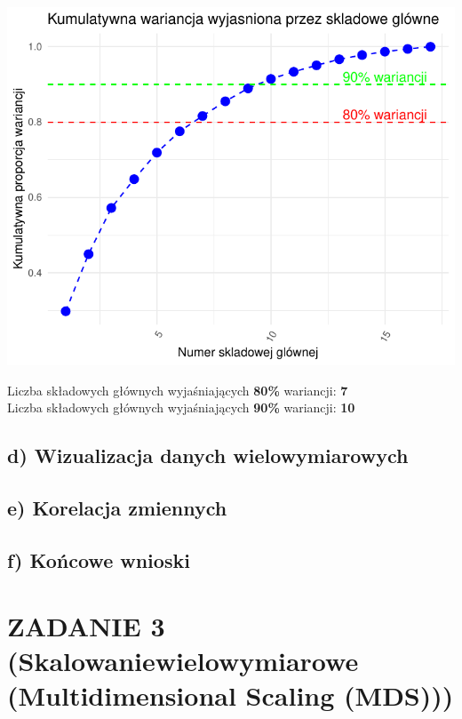 \documentclass[
  12pt,
]{article}
\begin{document}
\begin{center}\includegraphics{Sprawozdanie2_files/figure-latex/Zmiennosc_skladowych_w_PCA-2} \end{center}

Liczba składowych głównych wyjaśniających \textbf{80\%} wariancji:
\textbf{7}\\
Liczba składowych głównych wyjaśniających \textbf{90\%} wariancji:
\textbf{10}

\subsection{d) Wizualizacja danych
wielowymiarowych}\label{d-wizualizacja-danych-wielowymiarowych}

\subsection{e) Korelacja zmiennych}\label{e-korelacja-zmiennych}

\subsection{f) Końcowe wnioski}\label{f-koux144cowe-wnioski}

\section{ZADANIE 3 (Skalowaniewielowymiarowe (Multidimensional Scaling
(MDS)))}\label{zadanie-3-skalowaniewielowymiarowe-multidimensional-scaling-mds}
\end{document}
